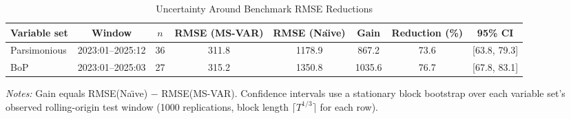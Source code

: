 \begin{table}[htbp]
\centering
\footnotesize
\caption{Uncertainty Around Benchmark RMSE Reductions}
\label{tab:headline_rmse_uncertainty}
\begin{tabular}{lccccccc}
\toprule
Variable set & Window & $n$ & RMSE (MS-VAR) & RMSE (Na\"{\i}ve) & Gain & Reduction (\%) & 95\% CI \\
\midrule
Parsimonious & 2023:01--2025:12 & 36 & 311.8 & 1178.9 & 867.2 & 73.6 & [63.8, 79.3] \\
BoP & 2023:01--2025:03 & 27 & 315.2 & 1350.8 & 1035.6 & 76.7 & [67.8, 83.1] \\
\bottomrule
\end{tabular}
\begin{tablenotes}
\footnotesize
\item \textit{Notes:} Gain equals RMSE(Na\"{\i}ve) $-$ RMSE(MS-VAR). Confidence intervals use a stationary block bootstrap over each variable set's observed rolling-origin test window (1000 replications, block length $\lceil T^{1/3} \rceil$ for each row).
\end{tablenotes}
\end{table}
